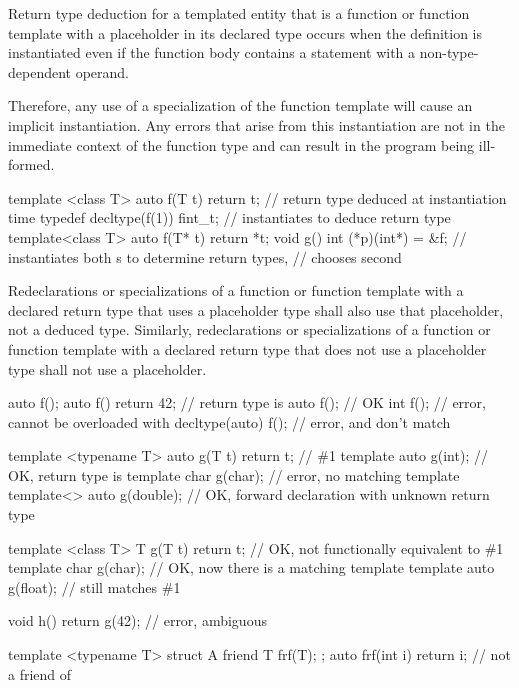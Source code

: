 \pnum
Return type deduction for a templated entity
that is a function or function template with a placeholder in its
declared type occurs when the definition is instantiated even if the function
body contains a  statement with a non-type-dependent operand.
\begin{note} Therefore, any use of a specialization of the function template will
cause an implicit instantiation. Any errors that arise from this instantiation
are not in the immediate context of the function type and can result in the
program being ill-formed. \end{note}
\begin{example}
\begin{codeblock}
template <class T> auto f(T t) { return t; }    // return type deduced at instantiation time
typedef decltype(f(1)) fint_t;                  // instantiates  to deduce return type
template<class T> auto f(T* t) { return *t; }
void g() { int (*p)(int*) = &f; }               // instantiates both s to determine return types,
                                                // chooses second
\end{codeblock}
\end{example}

\pnum
Redeclarations or specializations of a function or function template with a
declared return type that uses a placeholder type shall also use that
placeholder, not a deduced type.
Similarly,
redeclarations or specializations of a function or function template with a
declared return type that does not use a placeholder type
shall not use a placeholder.
\begin{example}
\begin{codeblock}
auto f();
auto f() { return 42; }                         // return type is 
auto f();                                       // OK
int f();                                        // error, cannot be overloaded with 
decltype(auto) f();                             // error,  and  don't match

template <typename T> auto g(T t) { return t; } // \#1
template auto g(int);                           // OK, return type is 
template char g(char);                          // error, no matching template
template<> auto g(double);                      // OK, forward declaration with unknown return type

template <class T> T g(T t) { return t; }       // OK, not functionally equivalent to \#1
template char g(char);                          // OK, now there is a matching template
template auto g(float);                         // still matches \#1

void h() { return g(42); }                      // error, ambiguous

template <typename T> struct A {
  friend T frf(T);
};
auto frf(int i) { return i; }                   // not a friend of 
\end{codeblock}
\end{example}

